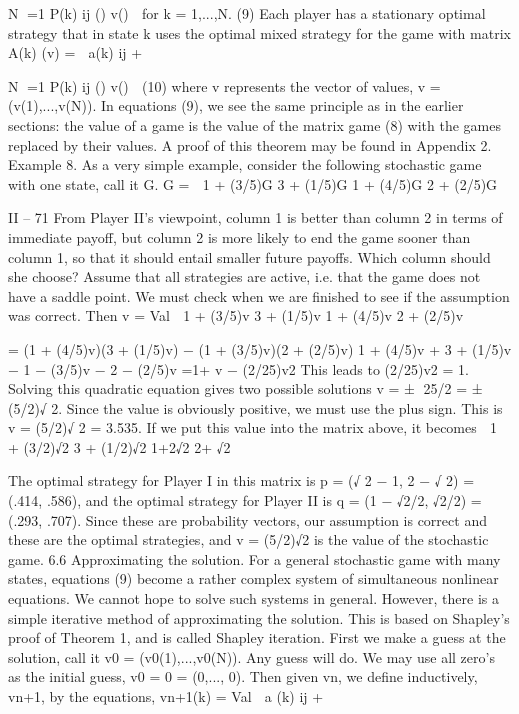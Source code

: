 N
=1
P(k)
ij () v()

for k = 1,...,N. (9)
Each player has a stationary optimal strategy that in state k uses the optimal mixed
strategy for the game with matrix
A(k)
(v) = 
a(k)
ij +

N
=1
P(k)
ij () v()

(10)
where v represents the vector of values, v = (v(1),...,v(N)).
In equations (9), we see the same principle as in the earlier sections: the value of a
game is the value of the matrix game (8) with the games replaced by their values. A proof
of this theorem may be found in Appendix 2.
Example 8. As a very simple example, consider the following stochastic game with
one state, call it G.
G =
 1 + (3/5)G 3 + (1/5)G
1 + (4/5)G 2 + (2/5)G

II – 71
From Player II’s viewpoint, column 1 is better than column 2 in terms of immediate payoff,
but column 2 is more likely to end the game sooner than column 1, so that it should entail
smaller future payoffs. Which column should she choose?
Assume that all strategies are active, i.e. that the game does not have a saddle point.
We must check when we are finished to see if the assumption was correct. Then
v = Val  1 + (3/5)v 3 + (1/5)v
1 + (4/5)v 2 + (2/5)v

= (1 + (4/5)v)(3 + (1/5)v) − (1 + (3/5)v)(2 + (2/5)v)
1 + (4/5)v + 3 + (1/5)v − 1 − (3/5)v − 2 − (2/5)v
=1+ v − (2/25)v2
This leads to
(2/25)v2 = 1.
Solving this quadratic equation gives two possible solutions v = ±
25/2 = ±(5/2)√
2.
Since the value is obviously positive, we must use the plus sign. This is v = (5/2)√
2 =
3.535. If we put this value into the matrix above, it becomes
 1 + (3/2)√2 3 + (1/2)√2
1+2√2 2+ √2

The optimal strategy for Player I in this matrix is p = (√
2 − 1, 2 − √
2) = (.414, .586),
and the optimal strategy for Player II is q = (1 − √2/2,
√2/2) = (.293, .707). Since these
are probability vectors, our assumption is correct and these are the optimal strategies, and
v = (5/2)√2 is the value of the stochastic game.
6.6 Approximating the solution. For a general stochastic game with many states,
equations (9) become a rather complex system of simultaneous nonlinear equations. We
cannot hope to solve such systems in general. However, there is a simple iterative method
of approximating the solution. This is based on Shapley’s proof of Theorem 1, and is called
Shapley iteration.
First we make a guess at the solution, call it v0 = (v0(1),...,v0(N)). Any guess will
do. We may use all zero’s as the initial guess, v0 = 0 = (0,..., 0). Then given vn, we
define inductively, vn+1, by the equations,
vn+1(k) = Val 
a
(k)
ij +

